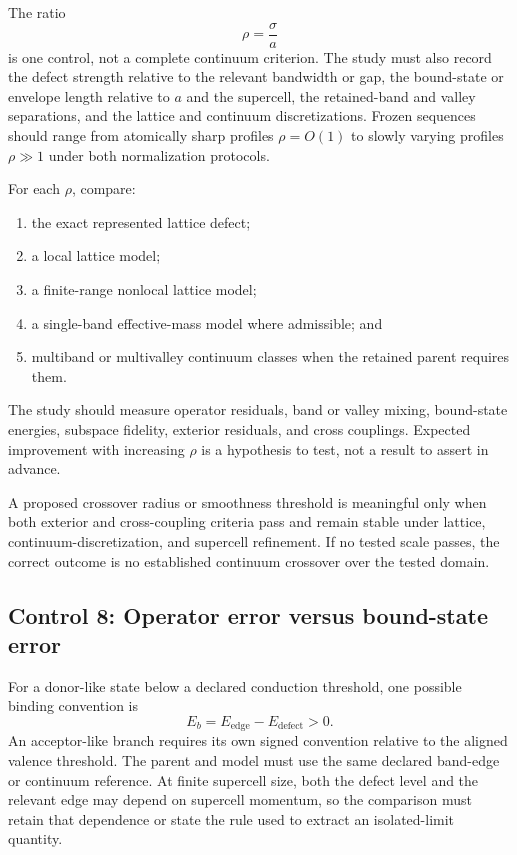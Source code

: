 The ratio
\begin{equation}
    \rho=\frac{\sigma}{a}
\end{equation}
is one control, not a complete continuum criterion. The study must also record
the defect strength relative to the relevant bandwidth or gap, the bound-state
or envelope length relative to $a$ and the supercell, the retained-band and
valley separations, and the lattice and continuum discretizations. Frozen
sequences should range from atomically sharp profiles $\rho=O(1)$ to slowly
varying profiles $\rho\gg1$ under both normalization protocols.

For each $\rho$, compare:
\begin{enumerate}
    \item the exact represented lattice defect;
    \item a local lattice model;
    \item a finite-range nonlocal lattice model;
    \item a single-band effective-mass model where admissible; and
    \item multiband or multivalley continuum classes when the retained parent
          requires them.
\end{enumerate}
The study should measure operator residuals, band or valley mixing, bound-state
energies, subspace fidelity, exterior residuals, and cross couplings. Expected
improvement with increasing $\rho$ is a hypothesis to test, not a result to
assert in advance.

A proposed crossover radius or smoothness threshold is meaningful only when
both exterior and cross-coupling criteria pass and remain stable under lattice,
continuum-discretization, and supercell refinement. If no tested scale passes,
the correct outcome is no established continuum crossover over the tested
domain.

\subsection*{Control 8: Operator error versus bound-state error}

For a donor-like state below a declared conduction threshold, one possible
binding convention is
\begin{equation}
    E_b
    =
    E_{\mathrm{edge}}-E_{\mathrm{defect}}>0.
\end{equation}
An acceptor-like branch requires its own signed convention relative to the
aligned valence threshold. The parent and model must use the same declared
band-edge or continuum reference. At finite supercell size, both the defect
level and the relevant edge may depend on supercell momentum, so the comparison
must retain that dependence or state the rule used to extract an isolated-limit
quantity.

